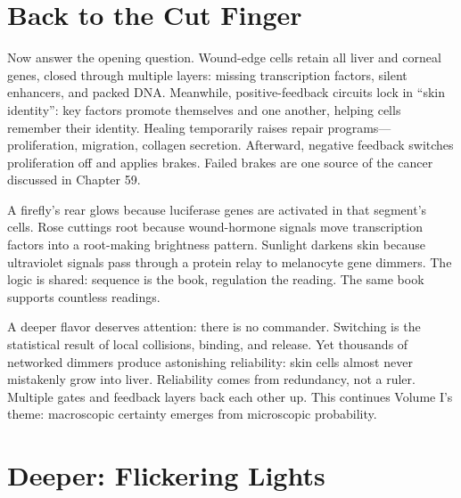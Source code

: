 \section{Back to the Cut Finger}

Now answer the opening question. Wound-edge cells retain all liver and corneal genes, closed through multiple layers: missing transcription factors, silent enhancers, and packed DNA. Meanwhile, positive-feedback circuits lock in ``skin identity'': key factors promote themselves and one another, helping cells remember their identity. Healing temporarily raises repair programs---proliferation, migration, collagen secretion. Afterward, negative feedback switches proliferation off and applies brakes. Failed brakes are one source of the cancer discussed in Chapter 59.

A firefly's rear glows because luciferase genes are activated in that segment's cells. Rose cuttings root because wound-hormone signals move transcription factors into a root-making brightness pattern. Sunlight darkens skin because ultraviolet signals pass through a protein relay to melanocyte gene dimmers. The logic is shared: sequence is the book, regulation the reading. The same book supports countless readings.

A deeper flavor deserves attention: there is no commander. Switching is the statistical result of local collisions, binding, and release. Yet thousands of networked dimmers produce astonishing reliability: skin cells almost never mistakenly grow into liver. Reliability comes from redundancy, not a ruler. Multiple gates and feedback layers back each other up. This continues Volume I's theme: macroscopic certainty emerges from microscopic probability.

\section{Deeper: Flickering Lights}

